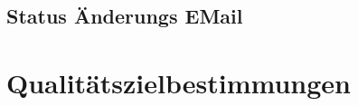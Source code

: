 \documentclass[a4paper,12pt]{article}
\begin{document}
\subsection {Status Änderungs EMail}
\begin{center}
\end{center}
\clearpage

\section{Qualitätszielbestimmungen}

\end{document}
